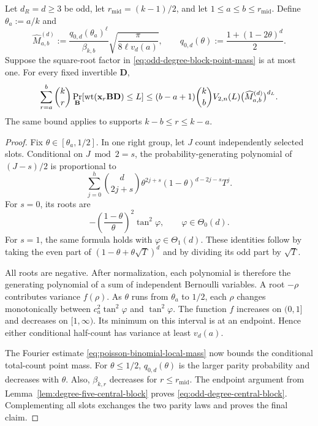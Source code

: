 \begin{lemma}
\label{lem:odd-degree-central-block}
Let $d_R=d\geq3$ be odd, let $r_{\mathrm{mid}}=(k-1)/2$, and let
$1\leq a\leq b\leq r_{\mathrm{mid}}$.  Define $\theta_a:=a/k$ and
\begin{equation}
 \widehat M^{(d)}_{a,b}:=
 \frac{q_{0,d}(\theta_a)^\ell}{\beta_{k,b}}
 \sqrt{\frac{\pi}{8\ell v_d(a)}},
 \qquad
 q_{0,d}(\theta):=\frac{1+(1-2\theta)^d}{2}.
 \label{eq:odd-degree-block-point-mass}
\end{equation}
Suppose the square-root factor in
\eqref{eq:odd-degree-block-point-mass} is at most one.  For every fixed
invertible $\mathbf D$,
\begin{equation}
 \sum_{r=a}^{b}\binom{k}{r}
 \Pr_{\mathbf B}[\operatorname{wt}(\mathbf x_r\mathbf B\mathbf D)\leq L]
 \leq(b-a+1)\binom{k}{b}V_{2,n}(L)
 \bigl(\widehat M^{(d)}_{a,b}\bigr)^{d_L}.
 \label{eq:odd-degree-central-block}
\end{equation}
The same bound applies to supports $k-b\leq r\leq k-a$.
\end{lemma}

\begin{proof}
Fix $\theta\in[\theta_a,1/2]$.  In one right group, let $J$ count independently
selected slots.  Conditional on $J\bmod2=s$, the probability-generating
polynomial of $(J-s)/2$ is proportional to
\begin{equation*}
 \sum_{j=0}^{h}\binom{d}{2j+s}
 \theta^{2j+s}(1-\theta)^{d-2j-s}T^j.
\end{equation*}
For $s=0$, its roots are
\begin{equation*}
 -\left(\frac{1-\theta}{\theta}\right)^2\tan^2\varphi,
 \qquad \varphi\in\Theta_0(d).
\end{equation*}
For $s=1$, the same formula holds with $\varphi\in\Theta_1(d)$.  These
identities follow by taking the even part of
$(1-\theta+\theta\sqrt T)^d$ and by
dividing its odd part by $\sqrt T$.

All roots are negative.  After normalization, each polynomial is therefore
the generating polynomial of a sum of independent Bernoulli variables.  A
root $-\rho$ contributes variance $f(\rho)$.  As $\theta$ runs from
$\theta_a$ to
$1/2$, each $\rho$ changes monotonically between
$c_a^2\tan^2\varphi$ and $\tan^2\varphi$.  The function $f$ increases on
$(0,1]$ and decreases on $[1,\infty)$.  Its minimum on this interval is at
an endpoint.  Hence either conditional half-count has variance at least
$v_d(a)$.

The Fourier estimate \eqref{eq:poisson-binomial-local-mass} now bounds the
conditional total-count point mass.  For $\theta\leq1/2$,
$q_{0,d}(\theta)$ is the larger parity probability and decreases with
$\theta$.  Also, $\beta_{k,r}$ decreases for
$r\leq r_{\mathrm{mid}}$.  The endpoint argument
from Lemma~\ref{lem:degree-five-central-block} proves
\eqref{eq:odd-degree-central-block}.  Complementing all slots exchanges the
two parity laws and proves the final claim.
\end{proof}

